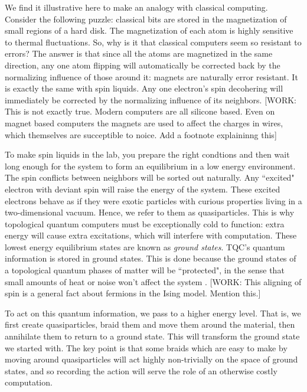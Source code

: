 \documentclass{article}
\theoremstyle{definition}
\numberwithin{figure}{section}
\begin{document}
We find it illustrative here to make an analogy with classical computing. Consider the following puzzle: classical bits are stored in the magnetization of small regions of a hard disk. The magnetization of each atom is highly sensitive to thermal fluctuations. So, why is it that classical computers seem so resistant to errors? The answer is that since all the atoms are magnetized in the same direction, any one atom flipping will automatically be corrected back by the normalizing influence of those around it: magnets are naturally error resistant. It is exactly the same with spin liquids. Any one electron's spin decohering will immediately be corrected by the normalizing influence of its neighbors. [WORK: This is not exactly true. Modern computers are all silicone based. Even on magnet based computers the magnets are used to affect the charges in wires, which themselves are succeptible to noice. Add a footnote explaininng this]

To make spin liquids in the lab, you prepare the right condtions and then wait long enough for the system to form an equilibrium in a low energy environment. The spin conflicts between neighbors will be sorted out naturally. Any ``excited" electron with deviant spin will raise the energy of the system. These excited electrons behave as if they were exotic particles with curious properties living in a two-dimensional vacuum. Hence, we refer to them as quasiparticles. This is why topological quantum computers must be exceptionally cold to function: extra energy will cause extra excitations, which will interfere with computation. These lowest energy equilibrium states are known as \textit{ground states}. TQC's quantum information is stored in ground states. This is done because the ground states of a topological quantum phases of matter will be ``protected", in the sense that small amounts of heat or noise won't affect the system \cite{wen1990ground}. [WORK: This aligning of spin is a general fact about fermions in the Ising model. Mention this.]

To act on this quantum information, we pass to a higher energy level. That is, we first create quasiparticles, braid them and move them around the material, then annihilate them to return to a ground state. This will transform the ground state we started with. The key point is that some braids which are easy to make by moving around quasiparticles will act highly non-trivially on the space of ground states, and so recording the action will serve the role of an otherwise costly computation.
\end{document}
